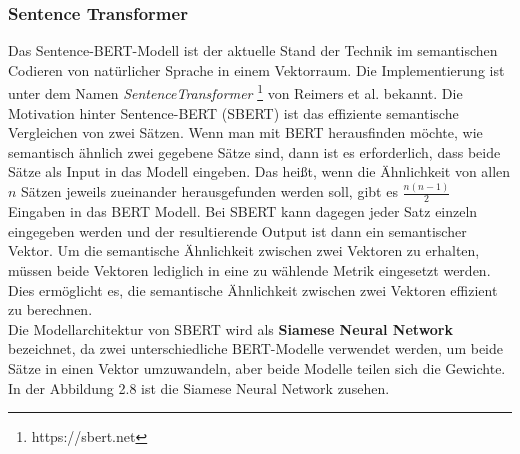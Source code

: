 \documentclass[12pt,letterpaper,ngerman]{article}
\begin{document}
\subsubsection{Sentence Transformer}
Das Sentence-BERT-Modell \cite{reimers-2019-sentence-bert}
ist der aktuelle Stand der Technik im semantischen Codieren 
von natürlicher Sprache in einem Vektorraum. Die Implementierung 
ist unter dem Namen \textit{SentenceTransformer} 
\footnote{https://sbert.net} von Reimers et al. bekannt.
Die Motivation hinter Sentence-BERT (SBERT) ist das effiziente
semantische Vergleichen 
von zwei Sätzen. Wenn man mit BERT herausfinden möchte, wie semantisch
ähnlich zwei gegebene Sätze sind, dann ist es erforderlich, dass beide
Sätze als Input in das Modell eingeben. Das heißt, wenn die Ähnlichkeit 
von allen $n$ Sätzen jeweils zueinander herausgefunden werden soll,
gibt es $\frac{n(n-1)}{2}$ Eingaben in das BERT Modell.
Bei SBERT kann dagegen jeder Satz einzeln eingegeben werden und der
resultierende Output ist dann ein semantischer Vektor. Um die
semantische Ähnlichkeit zwischen zwei Vektoren zu erhalten,
müssen beide Vektoren lediglich in eine zu wählende Metrik
eingesetzt werden. 
Dies ermöglicht es, die semantische Ähnlichkeit zwischen zwei Vektoren 
effizient zu berechnen.\\
Die Modellarchitektur von SBERT wird als {\bf Siamese Neural Network }
bezeichnet, da zwei unterschiedliche BERT-Modelle verwendet werden,
um beide Sätze in einen Vektor umzuwandeln, aber beide Modelle
teilen sich die Gewichte. In der Abbildung 2.8 ist die Siamese 
Neural Network zusehen.\\
\end{document}
